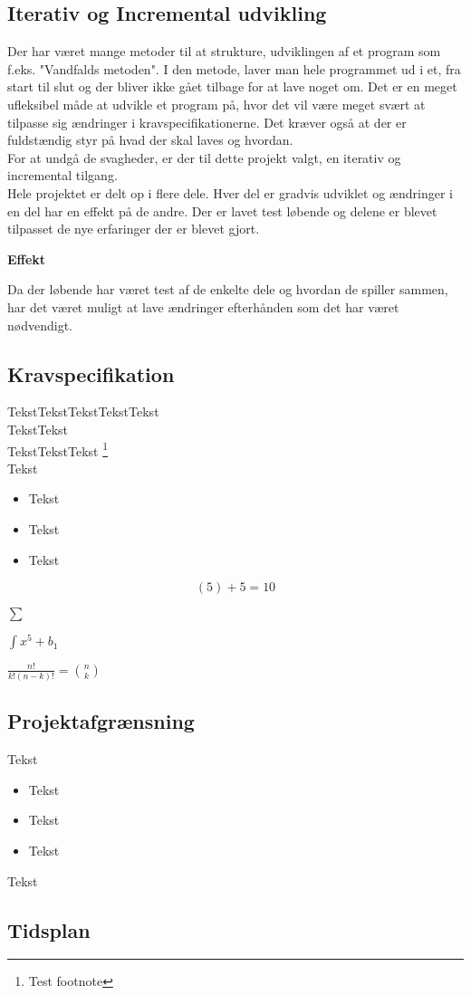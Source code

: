 \subsection{Iterativ og Incremental udvikling}
Der har været mange metoder til at strukture, udviklingen af et program som f.eks. "Vandfalds metoden". I den metode, laver man hele programmet ud i et, fra start til slut og der bliver ikke gået tilbage for at lave noget om. Det er en meget ufleksibel måde at udvikle et program på, hvor det vil være meget svært at tilpasse sig ændringer i kravspecifikationerne. Det kræver også at der er fuldstændig styr på hvad der skal laves og hvordan.\\

For at undgå de svagheder, er der til dette projekt valgt, en iterativ og incremental tilgang.\\
Hele projektet er delt op i flere dele. Hver del er gradvis udviklet og ændringer i en del har en effekt på de andre. Der er lavet test løbende og delene er blevet tilpasset de nye erfaringer der er blevet gjort.


\textbf{Effekt}

Da der løbende har været test af de enkelte dele og hvordan de spiller sammen, har det været muligt at lave ændringer efterhånden som det har været nødvendigt. 



\subsection{Kravspecifikation}

TekstTekstTekstTekstTekst\\
TekstTekst\\
TekstTekstTekst \footnote{Test footnote}\\
Tekst

\begin{itemize}
	\item Tekst
	\item Tekst
	\item Tekst

\end{itemize}

\[(5)+5=10\]


$\displaystyle \sum$


$\displaystyle \int x^5+b_1$


$\frac{n!}{k!(n-k)!} = \binom{n}{k}$

\subsection{Projektafgrænsning}

Tekst

\begin{itemize}
	\item Tekst
	\item Tekst
	\item Tekst
\end{itemize}

Tekst


\subsection{Tidsplan}